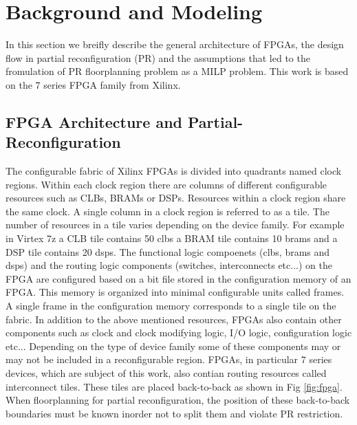\section{Background and Modeling}
In this section we breifly describe the general architecture of FPGAs, the design flow in partial reconfiguration (PR) and the assumptions that led to the fromulation of PR floorplanning problem as a MILP problem. This work is based on the 7 series FPGA family from Xilinx. \\

\subsection{FPGA Architecture and Partial-Reconfiguration}

The configurable fabric of Xilinx FPGAs is divided into quadrants named clock regions. Within each clock region there are columns of different configurable resources such as CLBs, BRAMs or DSPs.  Resources within a clock region share the same clock. A single column in a clock region is referred to as a tile. The number of resources in a tile varies depending on the device family. For example in Virtex 7z a CLB tile contains 50 clbs a BRAM tile contains 10 brams and a DSP tile contains 20 dsps. The functional logic compoenets (clbs, brams and dsps) and the routing logic components (switches, interconnects etc...) on the FPGA are configured based on a bit file stored in the configuration memory of an FPGA. This memory is organized into minimal configurable units called frames. A single frame in the configuration memory corresponds to a single tile on the fabric. In addition to the above mentioned resources, FPGAs also contain other components such as clock and clock modifying logic, I/O logic, configuration logic etc... Depending on the type of device family some of these components may or may not be included in a reconfigurable region. FPGAs, in particular 7 series devices, which are subject of this work, also contian routing resources called interconnect tiles. These tiles are placed back-to-back as shown in Fig \ref{fig:fpga}. When floorplanning for partial reconfiguration, the position of these back-to-back boundaries must be known inorder not to split them and violate PR restriction.

